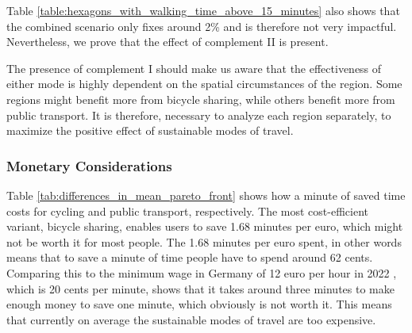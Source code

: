 Table \ref{table:hexagons_with_walking_time_above_15_minutes} also shows that the combined scenario only fixes around 2\% and is therefore not very impactful.
Nevertheless, we prove that the effect of complement II is present.

The presence of complement I should make us aware that the effectiveness of either mode is highly dependent on the spatial circumstances of the region.
Some regions might benefit more from bicycle sharing, while others benefit more from public transport.
It is therefore, necessary to analyze each region separately, to maximize the positive effect of sustainable modes of travel.





\subsubsection{Monetary Considerations}

Table \ref{tab:differences_in_mean_pareto_front} shows how a minute of saved time costs for cycling and public transport, respectively.
The most cost-efficient variant, bicycle sharing, enables users to save 1.68 minutes per euro, which might not be worth it for most people.
The 1.68 minutes per euro spent, in other words means that to save a minute of time people have to spend around 62 cents.
Comparing this to the minimum wage in Germany of 12 euro per hour in 2022 , which is 20 cents per minute, shows that it takes around three minutes to make enough money to save one minute, which obviously is not worth it.
This means that currently on average the sustainable modes of travel are too expensive.

